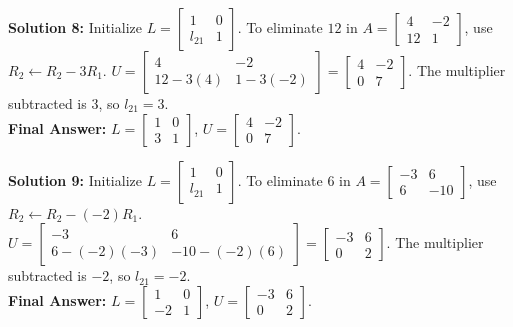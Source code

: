 \documentclass[11pt]{article}
\begin{document}
\textbf{Solution 8:}
Initialize $L = \begin{bmatrix} 1 & 0 \\ l_{21} & 1 \end{bmatrix}$.
To eliminate $12$ in $A = \begin{bmatrix} 4 & -2 \\ 12 & 1 \end{bmatrix}$, use $R_2 \leftarrow R_2 - 3R_1$.
$U = \begin{bmatrix} 4 & -2 \\ 12 - 3(4) & 1 - 3(-2) \end{bmatrix} = \begin{bmatrix} 4 & -2 \\ 0 & 7 \end{bmatrix}$.
The multiplier subtracted is $3$, so $l_{21} = 3$. \\
\textbf{Final Answer:} $L = \begin{bmatrix} 1 & 0 \\ 3 & 1 \end{bmatrix}$, $U = \begin{bmatrix} 4 & -2 \\ 0 & 7 \end{bmatrix}$.

\vspace{0.5cm}
\textbf{Solution 9:}
Initialize $L = \begin{bmatrix} 1 & 0 \\ l_{21} & 1 \end{bmatrix}$.
To eliminate $6$ in $A = \begin{bmatrix} -3 & 6 \\ 6 & -10 \end{bmatrix}$, use $R_2 \leftarrow R_2 - (-2)R_1$.
$U = \begin{bmatrix} -3 & 6 \\ 6 - (-2)(-3) & -10 - (-2)(6) \end{bmatrix} = \begin{bmatrix} -3 & 6 \\ 0 & 2 \end{bmatrix}$.
The multiplier subtracted is $-2$, so $l_{21} = -2$. \\
\textbf{Final Answer:} $L = \begin{bmatrix} 1 & 0 \\ -2 & 1 \end{bmatrix}$, $U = \begin{bmatrix} -3 & 6 \\ 0 & 2 \end{bmatrix}$.
\end{document}
